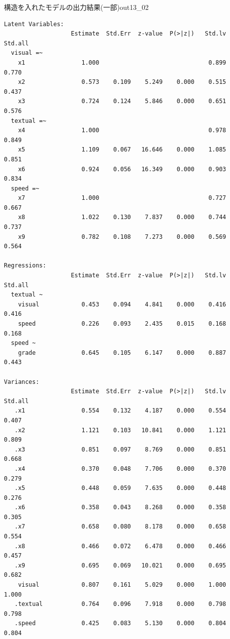 \begin{Rscreen}{構造を入れたモデルの出力結果(一部)}{out13_02}
	\begin{verbatim}
Latent Variables:
                   Estimate  Std.Err  z-value  P(>|z|)   Std.lv  Std.all
  visual =~                                                             
    x1                1.000                               0.899    0.770
    x2                0.573    0.109    5.249    0.000    0.515    0.437
    x3                0.724    0.124    5.846    0.000    0.651    0.576
  textual =~                                                            
    x4                1.000                               0.978    0.849
    x5                1.109    0.067   16.646    0.000    1.085    0.851
    x6                0.924    0.056   16.349    0.000    0.903    0.834
  speed =~                                                              
    x7                1.000                               0.727    0.667
    x8                1.022    0.130    7.837    0.000    0.744    0.737
    x9                0.782    0.108    7.273    0.000    0.569    0.564

Regressions:
                   Estimate  Std.Err  z-value  P(>|z|)   Std.lv  Std.all
  textual ~                                                             
    visual            0.453    0.094    4.841    0.000    0.416    0.416
    speed             0.226    0.093    2.435    0.015    0.168    0.168
  speed ~                                                               
    grade             0.645    0.105    6.147    0.000    0.887    0.443

Variances:
                   Estimate  Std.Err  z-value  P(>|z|)   Std.lv  Std.all
   .x1                0.554    0.132    4.187    0.000    0.554    0.407
   .x2                1.121    0.103   10.841    0.000    1.121    0.809
   .x3                0.851    0.097    8.769    0.000    0.851    0.668
   .x4                0.370    0.048    7.706    0.000    0.370    0.279
   .x5                0.448    0.059    7.635    0.000    0.448    0.276
   .x6                0.358    0.043    8.268    0.000    0.358    0.305
   .x7                0.658    0.080    8.178    0.000    0.658    0.554
   .x8                0.466    0.072    6.478    0.000    0.466    0.457
   .x9                0.695    0.069   10.021    0.000    0.695    0.682
    visual            0.807    0.161    5.029    0.000    1.000    1.000
   .textual           0.764    0.096    7.918    0.000    0.798    0.798
   .speed             0.425    0.083    5.130    0.000    0.804    0.804
\end{verbatim}
\end{Rscreen}
